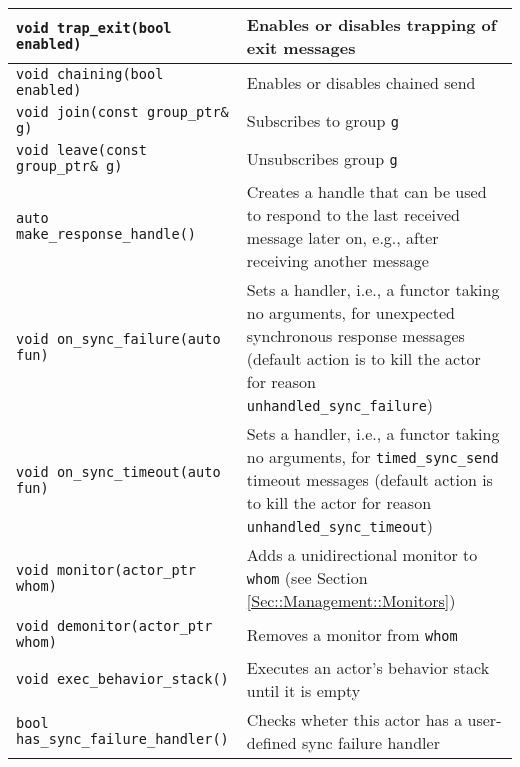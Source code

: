 {\begin{tabular*}{\textwidth}{m{}m{}}
  \hline
  \lstinline^void trap_exit(bool enabled)^ & Enables or disables trapping of exit messages \\
  \hline
  \lstinline^void chaining(bool enabled)^ & Enables or disables chained send \\
  \hline
  \lstinline^void join(const group_ptr& g)^ & Subscribes to group \lstinline^g^ \\
  \hline
  \lstinline^void leave(const group_ptr& g)^ & Unsubscribes group \lstinline^g^ \\
  \hline
  \lstinline^auto make_response_handle()^ & Creates a handle that can be used to respond to the last received message later on, e.g., after receiving another message \\
  \hline
  \lstinline^void on_sync_failure(auto fun)^ & Sets a handler, i.e., a functor taking no arguments, for unexpected synchronous response messages (default action is to kill the actor for reason \lstinline^unhandled_sync_failure^) \\
  \hline
  \lstinline^void on_sync_timeout(auto fun)^ & Sets a handler, i.e., a functor taking no arguments, for \lstinline^timed_sync_send^ timeout messages (default action is to kill the actor for reason \lstinline^unhandled_sync_timeout^) \\
  \hline
  \lstinline^void monitor(actor_ptr whom)^ & Adds a unidirectional monitor to \lstinline^whom^ (see Section \ref{Sec::Management::Monitors}) \\
  \hline
  \lstinline^void demonitor(actor_ptr whom)^ & Removes a monitor from \lstinline^whom^ \\
  \hline
  \lstinline^void exec_behavior_stack()^ & Executes an actor's behavior stack until it is empty \\
  \hline
  \lstinline^bool has_sync_failure_handler()^ & Checks wheter this actor has a user-defined sync failure handler \\
  \hline
\end{tabular*}
}
